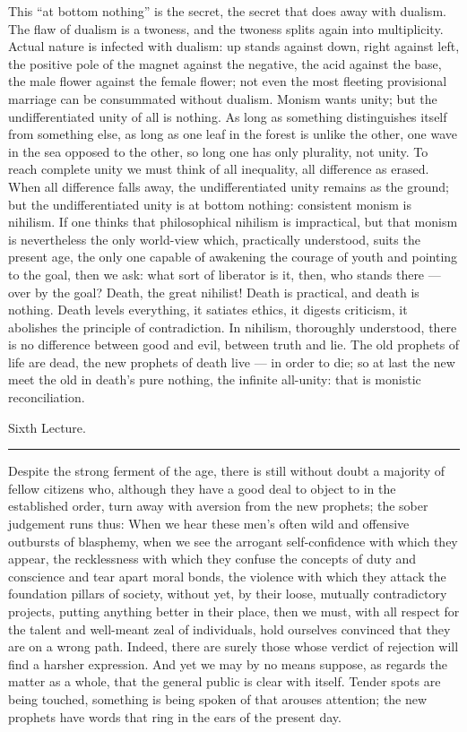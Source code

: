 \documentclass[12pt,a4paper,openany]{book}
\newcommand{\opage}[1]{\marginnote{\footnotesize\textit{[#1]}}}
\newcommand{\lecture}[1]{\clearpage\begin{center}{\large #1}\\[0.4em]\rule{3em}{0.4pt}\end{center}\medskip\noindent}
\begin{document}
This ``at bottom nothing'' is the secret, the
secret that does away with dualism. The flaw of dualism
is a twoness, and the twoness splits
again into multiplicity. Actual nature is infected
with dualism: up stands against down, right
against left, the positive pole of the magnet against the negative,
the acid against the base, the male flower against the female flower;
not even the most fleeting provisional marriage can be consummated
without dualism. Monism wants unity; but
the undifferentiated unity of all is nothing. As long as
something distinguishes itself from something else, as long as one leaf in
the forest is unlike the other, one wave in the sea
\setcounter{footnote}{0}%
\opage{95}opposed to the other, so long one has only plurality, not
unity. To reach complete unity we must
think of all inequality, all difference as erased.
When all difference falls away, the undifferentiated
unity remains as the ground; but the undifferentiated
unity is at bottom nothing: consistent monism
is nihilism. If one thinks that philosophical nihilism
is impractical, but that monism is nevertheless the only
world-view which, practically understood, suits the present age,
the only one capable of awakening the courage of youth
and pointing to the goal, then we ask: what sort of
liberator is it, then, who stands there --- over by the goal?
Death, the great nihilist! Death is practical, and
death is nothing. Death levels everything, it satiates ethics,
it digests criticism, it abolishes the principle
of contradiction. In nihilism, thoroughly understood, there is
no difference between good and evil, between truth
and lie. The old prophets of life are dead, the new
prophets of death live --- in order to die; so at last
the new meet the old in death's pure nothing, the infinite
all-unity: that is monistic reconciliation.

\setcounter{footnote}{0}%
\lecture{Sixth Lecture.}\opage{96}Despite the strong ferment of the age, there is still
without doubt a majority of fellow citizens who, although they
have a good deal to object to in the established order, turn away
with aversion from the new prophets; the
sober judgement runs thus: When we hear these
men's often wild and offensive outbursts of blasphemy,
when we see the arrogant self-confidence
with which they appear, the recklessness with which they
confuse the concepts of duty and conscience and tear apart
moral bonds, the violence with which they attack
the foundation pillars of society, without yet, by their loose,
mutually contradictory projects, putting anything better
in their place, then we must, with all respect for the talent
and well-meant zeal of individuals, hold ourselves convinced that
they are on a wrong path. Indeed, there are surely those whose verdict of rejection
will find a harsher expression. And yet
we may by no means suppose, as regards the matter as a whole,
that the general public is clear with itself. Tender spots
are being touched, something is being spoken of that arouses
attention; the new prophets have words that ring
in the ears of the present day.
\end{document}
